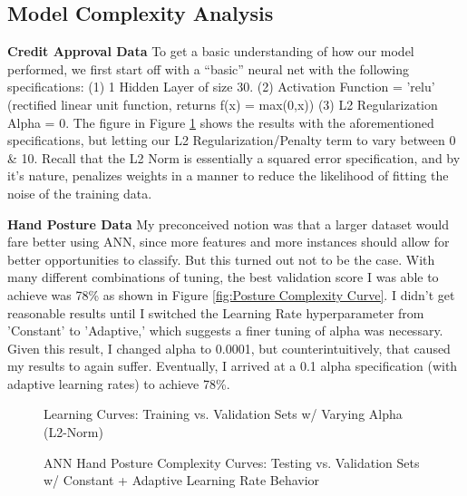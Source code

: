 \documentclass[letterpaper,12pt]{article}
\begin{document}
\subsection{Model Complexity Analysis}
\textbf{Credit Approval Data}  To get a basic understanding of how our model performed, we first start off with a ``basic'' neural net with the following specifications:  (1) 1 Hidden Layer of size 30.  (2) Activation Function = 'relu' (rectified linear unit function, returns f(x) = max(0,x)) (3) L2 Regularization Alpha = 0.  The figure in Figure \ref{fig:ANN Learning Curves} shows the results with the aforementioned specifications, but letting our L2 Regularization/Penalty term to vary between 0 \& 10.
Recall that the L2 Norm is essentially a squared error specification, and by it's nature, penalizes weights in a manner to reduce the likelihood of fitting the noise of the training data.

\textbf{Hand Posture Data}  My preconceived notion was that a larger dataset would fare better using ANN, since more features and more instances should allow for better opportunities to classify.  But this turned out not to be the case.  With many different combinations of tuning, the best validation score  I was able to achieve was 78\% as shown in Figure \ref{fig:Posture Complexity Curve}.  I didn't get reasonable results until I switched the Learning Rate hyperparameter from 'Constant' to 'Adaptive,' which suggests a finer tuning of alpha was necessary.  Given this result, I changed alpha to 0.0001, but counterintuitively, that caused my results to again suffer.  Eventually, I arrived at a 0.1 alpha specification (with adaptive learning rates) to achieve 78\%.

\begin{figure} %
  \centering
  \hspace{8pt}%
  \caption{Learning Curves:  Training vs. Validation Sets w/ Varying Alpha (L2-Norm)}\label{fig:ANN Learning Curves}
\end{figure}


\begin{figure} %
  \centering
  \hspace{8pt}%
  \subfigure[[\centering ANN: Hand Posture Data \\
  \centering 1 Hidden Layer, 50 Nodes, Constant LR, 0.1 Alpha]{%
    \label{fig:Posture Complexity Curve2}%
    \texttt{[image: Neural\_Nets/output/Posture\_Accuracy\_Rates2.png]}}
  \caption{ANN Hand Posture Complexity Curves:  Testing vs. Validation Sets w/ Constant + Adaptive Learning Rate Behavior}\label{fig:ANN Complexity Curves}
\end{figure}
\end{document}
